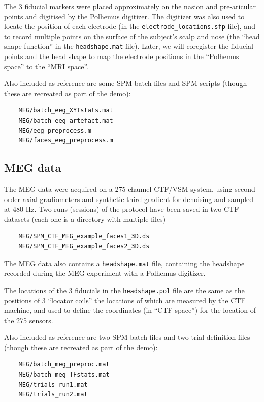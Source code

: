 The 3 fiducial markers were placed approximately on the nasion and pre-aricular points and digitised by the Polhemus digitizer. The digitizer was also used to locate the position of each electrode (in the \texttt{electrode\_locations.sfp} file), and to record multiple points on the surface of the  subject's scalp and nose (the ``head shape function'' in the \texttt{headshape.mat} file). Later, we will coregister the fiducial points and the head shape to map the electrode positions in the ``Polhemus space'' to the ``MRI space''.

Also included as reference are some SPM batch files and SPM scripts (though these are recreated as part of the demo):

\begin{verbatim}
    MEG/batch_eeg_XYTstats.mat
    MEG/batch_eeg_artefact.mat
    MEG/eeg_preprocess.m
    MEG/faces_eeg_preprocess.m
\end{verbatim}


\subsection{MEG data \label{multimodal:data:meg}}

The MEG data were acquired on a 275 channel CTF/VSM system, using second-order axial gradiometers and synthetic third gradient for denoising and sampled at 480 Hz. Two runs (sessions) of the protocol have been saved in two CTF datasets (each one is a directory with multiple files) 
\begin{verbatim}
    MEG/SPM_CTF_MEG_example_faces1_3D.ds
    MEG/SPM_CTF_MEG_example_faces2_3D.ds
\end{verbatim}
The MEG data also contains a \texttt{headshape.mat} file, containing the headshape recorded during the MEG experiment with a Polhemus digitizer.

The locations of the 3 fiducials in the \texttt{headshape.pol} file are the same as the positions of 3 ``locator coils'' the locations of which are measured by the CTF machine, and used to define the coordinates (in ``CTF space'') for the location of the 275 sensors.

Also included as reference are two SPM batch files and two trial definition files (though these are recreated as part of the demo):
\begin{verbatim}
    MEG/batch_meg_preproc.mat
    MEG/batch_meg_TFstats.mat
    MEG/trials_run1.mat
    MEG/trials_run2.mat
\end{verbatim}

